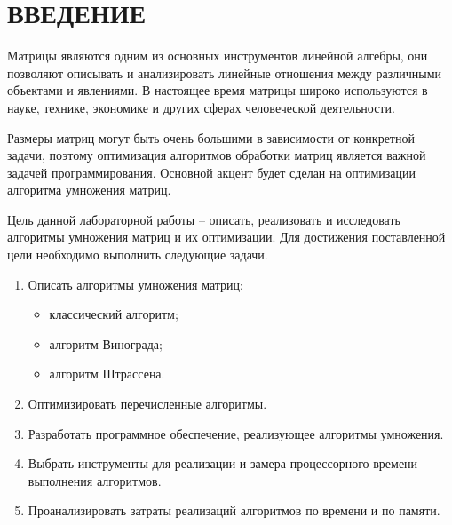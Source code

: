 \chapter*{ВВЕДЕНИЕ}

Матрицы являются одним из основных инструментов линейной алгебры, они позволяют описывать и анализировать линейные отношения между различными объектами и явлениями. В настоящее время матрицы широко используются в науке, технике, экономике и других сферах человеческой деятельности.

Размеры матриц могут быть очень большими в зависимости от конкретной задачи, поэтому оптимизация алгоритмов обработки матриц является важной задачей программирования. Основной акцент будет сделан на оптимизации алгоритма умножения матриц.

Цель данной лабораторной работы -- описать, реализовать и исследовать алгоритмы умножения матриц и их оптимизации.
Для достижения поставленной цели необходимо выполнить следующие задачи.
\begin{enumerate}
	\item Описать алгоритмы умножения матриц: 
	\begin{itemize}
		\item классический алгоритм;
		\item алгоритм Винограда;
		\item алгоритм Штрассена.
	\end{itemize}
	\item Оптимизировать перечисленные алгоритмы.
	\item Разработать программное обеспечение, реализующее алгоритмы умножения.
	\item Выбрать инструменты для реализации и замера процессорного времени
	выполнения алгоритмов.
	\item Проанализировать затраты реализаций алгоритмов по времени и по памяти.
\end{enumerate}


